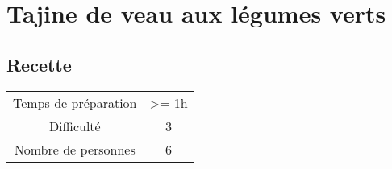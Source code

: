 \newpage
\section{Tajine de veau aux légumes verts}
    \label{sec:Tajine de veau aux légumes verts}
    \subsection{Recette}
    \vspace{1cm}


    \begin{center}
        \begin{tabular}{c|c}
            Temps de préparation & >= 1h \\
            Difficulté & 3 \\
            Nombre de personnes & 6 
        \end{tabular}
    \end{center}{}

    \vspace{1cm}
    \hline
    \vspace{1cm}

